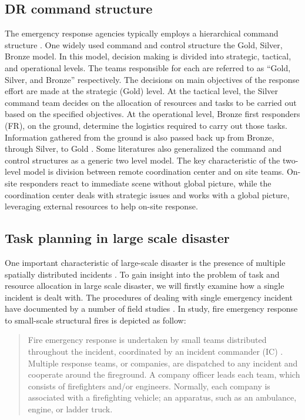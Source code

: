 \subsection{DR command structure}\label{sec:lrstructure}
The emergency response agencies typically employs a hierarchical command structure \cite{Ramchurn2015}. One widely used command and control structure the Gold, Silver, Bronze model. In this model, decision making is divided into strategic, tactical, and operational levels. The teams responsible for each are referred to as ``Gold, Silver, and Bronze'' respectively. The decisions on main objectives of the response effort are made at the strategic (Gold) level. At the tactical level, the Silver command team decides on the allocation of resources and tasks to be carried out  based on the specified objectives. At the operational level, Bronze first responders (FR), on the ground, determine the logistics required to carry out those tasks. Information gathered from the ground is also passed back up from Bronze, through Silver, to Gold \cite{Ramchurn2015}. Some literatures \cite{Chen2005,Chen2008} also generalized the command and control structures as a generic two level model. The key characteristic of the two-level model is division between remote coordination center and on site teams.  On-site responders react to immediate scene without global picture, while the coordination center deals with strategic issues and works with a global picture, leveraging external resources to help on-site response. \\


\subsection{Task planning in large scale disaster} \label{sec:LRtaskplanning}
One important characteristic of large-scale disaster is the presence of multiple spatially distributed incidents \cite{Chen2005}. To gain insight into the problem of task and resource allocation in large scale disaster, we will firstly examine how a single incident is dealt with. The procedures of dealing with single emergency incident have documented by a number of field studies \cite{Comfort2004,Dawes2004,Petrescu-prahova2005}. In \cite{Toups2011} study, fire emergency response to small-scale structural fires is depicted as follow: 

\begin{quote}
Fire emergency response is undertaken by small teams distributed throughout the incident, coordinated by an incident commander (IC) . Multiple response teams, or companies, are dispatched to any incident and cooperate around the fireground. A company officer leads each team, which consists of firefighters and/or engineers. Normally, each company is associated with a firefighting vehicle; an apparatus, such as an ambulance, engine, or ladder truck.\\
\end{quote}

